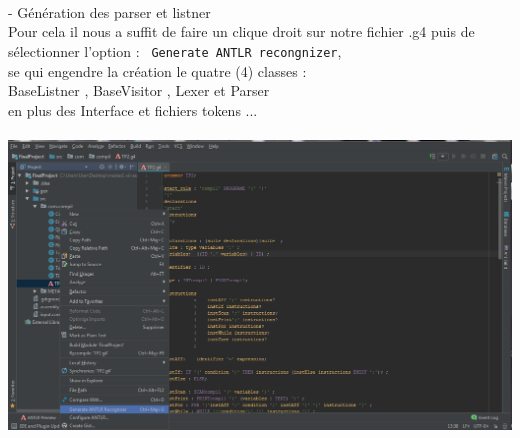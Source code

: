 \documentclass[12pt]{article}
\begin{document}
\texttt{ }\\
-	Génération des parser et listner\\
Pour cela il nous a suffit de faire un clique droit sur notre fichier .g4 puis de sélectionner l'option : \texttt{ Generate ANTLR recongnizer},\\
se qui engendre la création le quatre (4) classes : \\
BaseListner , BaseVisitor , Lexer et Parser \\
 en plus des Interface et fichiers tokens ...\\
\texttt{ }\\
\includegraphics[width=1\textwidth]{IMG/Generer.png}
\end{document}
